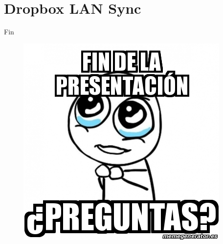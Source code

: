 \documentclass[10pt]{beamer}
\begin{document}
\section{Dropbox LAN Sync}


\begin{frame}{Fin}
\begin{figure}[h]
  \centering
  \includegraphics[width=0.78\linewidth]{fin}
\end{figure}
\end{frame}
\end{document}
